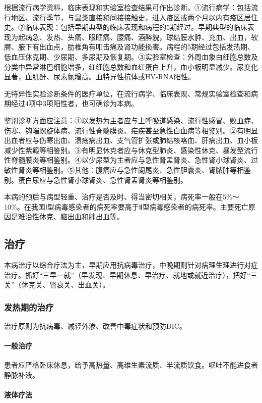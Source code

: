 根据流行病学资料，临床表现和实验室检查结果可作出诊断。①流行病学：包括流行地区、流行季节，与鼠类直接和间接接触史，进入疫区或两个月以内有疫区居住史。②临床表现：包括早期典型的临床表现和病程的5期经过。早期典型的临床表现为起病急、发热、头痛、眼眶痛、腰痛、酒醉貌，球结膜水肿、充血、出血，软腭、腋下有出血点，肋椎角有叩击痛及肾功能损害。病程的5期经过包括发热期、低血压休克期、少尿期、多尿期及恢复期。③实验室检查：外周血象白细胞总数及分类中异常淋巴细胞增多，红细胞总数和血红蛋白上升，血小板明显减少。尿变化显著，血肌酐、尿素氮增高。血特异性抗体或HV-RNA阳性。

无特异性实验诊断条件的医疗单位，在流行病学、临床表现、常规实验室检查和病期经过4项中3项阳性者，也可确诊为本病。

鉴别诊断方面应注意：①以发热为主者应与上呼吸道感染、流行性感冒、败血症、伤寒、钩端螺旋体病、流行性脊髓膜炎、疟疾甚至急性白血病等相鉴别。②有明显出血者应与伤寒出血、溃疡病出血、支气管扩张或肺结核咯血、肝病出血、血小板减少性紫癜等相鉴别。③有明显休克者应与休克型肺炎、感染性休克、暴发型流行性脊髓膜炎等相鉴别。④以少尿型为主者应与急性肾盂肾炎、急性肾小球肾炎、过敏性肾炎等相鉴别。⑤其他：腹痛应与急性阑尾炎、急性胆囊炎、肾脓肿等相鉴别。蛋白尿应与急性肾小球肾炎、急性肾盂肾炎等相鉴别。

本病的预后与病型轻重、治疗是否及时、得当密切相关，病死率一般在5\%～10\%。在我国Ⅰ型病毒感染者的病死率要高于Ⅱ型病毒感染者的病死率。主要死亡原因是难治性休克、脑出血和肺出血等。

\subsection{治疗}

本病治疗以综合疗法为主，早期应用抗病毒治疗，中晚期则针对病理生理进行对症治疗。抓好“三早一就”（早发现、早期休息、早治疗、就地或就近治疗），把好“三关”（休克关、肾衰关、出血关）。

\subsubsection{发热期的治疗}

治疗原则为抗病毒、减轻外渗、改善中毒症状和预防DIC。

\paragraph{一般治疗}

患者应严格卧床休息，给予高热量、高维生素流质、半流质饮食。呕吐不能进食者静脉补液。

\paragraph{液体疗法}

